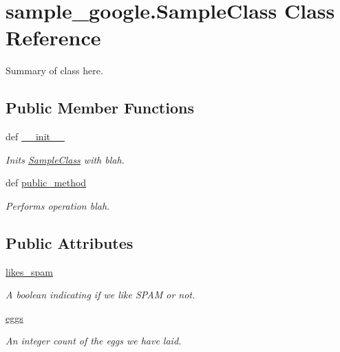 \hypertarget{classsample__google_1_1SampleClass}{\section{sample\-\_\-google.\-Sample\-Class \-Class \-Reference}
\label{classsample__google_1_1SampleClass}
}


\-Summary of class here.  


\subsection*{\-Public \-Member \-Functions}
\begin{DoxyCompactItemize}
\item 
def \hyperlink{classsample__google_1_1SampleClass_ad402c186c5ea9e6450d81466991dcb1b}{\-\_\-\-\_\-init\-\_\-\-\_\-}
\begin{DoxyCompactList}\small\item\em \-Inits \hyperlink{classsample__google_1_1SampleClass}{\-Sample\-Class} with blah. \end{DoxyCompactList}\item 
def \hyperlink{classsample__google_1_1SampleClass_a3512318d4e962a2ef2cae1b7f92143f8}{public\-\_\-method}
\begin{DoxyCompactList}\small\item\em \-Performs operation blah. \end{DoxyCompactList}\end{DoxyCompactItemize}
\subsection*{\-Public \-Attributes}
\begin{DoxyCompactItemize}
\item 
\hyperlink{classsample__google_1_1SampleClass_af2f150d91cb0a82149140df573e1ff7c}{likes\-\_\-spam}
\begin{DoxyCompactList}\small\item\em \-A boolean indicating if we like \-S\-P\-A\-M or not. \end{DoxyCompactList}\item 
\hyperlink{classsample__google_1_1SampleClass_a122f3cf256ce62baea1d811c0919efa1}{eggs}
\begin{DoxyCompactList}\small\item\em \-An integer count of the eggs we have laid. \end{DoxyCompactList}\end{DoxyCompactItemize}
